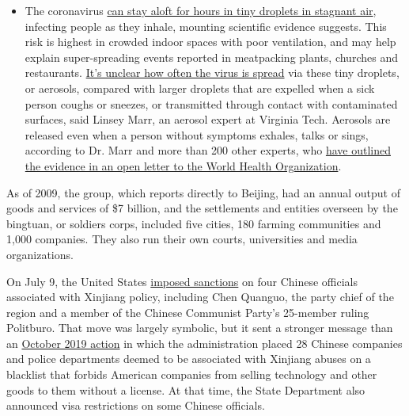 \begin{itemize}
  \begin{itemize}
  \tightlist
  \item
    The coronavirus
    \href{https://www.nytimes3xbfgragh.onion/2020/07/04/health/239-experts-with-one-big-claim-the-coronavirus-is-airborne.html?action=click\&pgtype=Article\&state=default\&region=MAIN_CONTENT_3\&context=storylines_faq}{can
    stay aloft for hours in tiny droplets in stagnant air}, infecting
    people as they inhale, mounting scientific evidence suggests. This
    risk is highest in crowded indoor spaces with poor ventilation, and
    may help explain super-spreading events reported in meatpacking
    plants, churches and restaurants.
    \href{https://www.nytimes3xbfgragh.onion/2020/07/06/health/coronavirus-airborne-aerosols.html?action=click\&pgtype=Article\&state=default\&region=MAIN_CONTENT_3\&context=storylines_faq}{It's
    unclear how often the virus is spread} via these tiny droplets, or
    aerosols, compared with larger droplets that are expelled when a
    sick person coughs or sneezes, or transmitted through contact with
    contaminated surfaces, said Linsey Marr, an aerosol expert at
    Virginia Tech. Aerosols are released even when a person without
    symptoms exhales, talks or sings, according to Dr. Marr and more
    than 200 other experts, who
    \href{https://academic.oup.com/cid/article/doi/10.1093/cid/ciaa939/5867798}{have
    outlined the evidence in an open letter to the World Health
    Organization}.
  \end{itemize}
\end{itemize}

As of 2009, the group, which reports directly to Beijing, had an annual
output of goods and services of \$7 billion, and the settlements and
entities overseen by the bingtuan, or soldiers corps, included five
cities, 180 farming communities and 1,000 companies. They also run their
own courts, universities and media organizations.

On July 9, the United States
\href{https://www.nytimes3xbfgragh.onion/2020/07/09/world/asia/trump-china-sanctions-uighurs.html}{imposed
sanctions} on four Chinese officials associated with Xinjiang policy,
including Chen Quanguo, the party chief of the region and a member of
the Chinese Communist Party's 25-member ruling Politburo. That move was
largely symbolic, but it sent a stronger message than an
\href{https://www.nytimes3xbfgragh.onion/2019/10/08/business/china-human-rights-technology-xinjiang.html}{October
2019 action} in which the administration placed 28 Chinese companies and
police departments deemed to be associated with Xinjiang abuses on a
blacklist that forbids American companies from selling technology and
other goods to them without a license. At that time, the State
Department also announced visa restrictions on some Chinese officials.

